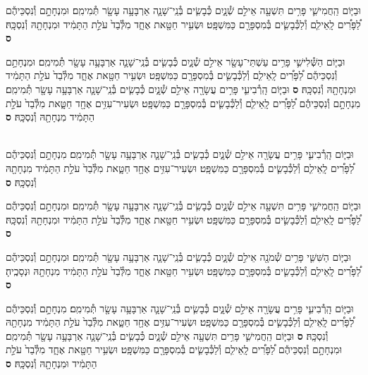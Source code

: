 \documentclass[twoside, openany, parskip=half, 11pt]{book}
\begin{document}
\begin{footnotesize}
\begin{multicols}{2}
וּבַיּ֧וֹם הַֽחֲמִישִׁ֛י פָּרִ֥ים תִּשְׁעָ֖ה אֵילִ֣ם שְׁ֯נָ֑יִם כְּ֯בָשִׂ֧ים בְּ֯נֵֽי־שָׁנָ֛ה אַרְבָּעָ֥ה עָשָׂ֖ר תְּ֯מִימִֽם׃ וּמִנְחָתָ֣ם וְ֯נִסְכֵּיהֶ֡ם לַ֠פָּרִ֠ים לָֽאֵילִ֧ם וְ֯לַכְּ֯בָשִׂ֛ים בְּ֯מִסְפָּרָ֖ם כַּמִּשְׁפָּֽט׃ וּשְׂעִ֥יר חַטָּ֖את אֶחָ֑ד מִלְּ֯בַד֙ עֹלַ֣ת הַתָּמִ֔יד וּמִנְחָתָ֖הּ וְ֯נִסְכָּֽהּ׃ \textbf{ס}

וּבַיּ֧וֹם הַשְּׁ֯לִישִׁ֛י פָּרִ֥ים עַשְׁתֵּי־עָשָׂ֖ר אֵילִ֣ם שְׁ֯נָ֑יִם כְּ֯בָשִׂ֧ים בְּ֯נֵֽי־שָׁנָ֛ה אַרְבָּעָ֥ה עָשָׂ֖ר תְּ֯מִימִֽם׃ וּמִנְחָתָ֣ם וְ֯נִסְכֵּיהֶ֡ם לַ֠פָּרִ֠ים לָֽאֵילִ֧ם וְ֯לַכְּ֯בָשִׂ֛ים בְּ֯מִסְפָּרָ֖ם כַּמִּשְׁפָּֽט׃ וּשְׂעִ֥יר חַטָּ֖את אֶחָ֑ד מִלְּ֯בַד֙ עֹלַ֣ת הַתָּמִ֔יד וּמִנְחָתָ֖הּ וְ֯נִסְכָּֽהּ׃ \textbf{ס}
וּבַיּ֧וֹם הָֽרְ֯בִיעִ֛י פָּרִ֥ים עֲשָׂרָ֖ה אֵילִ֣ם שְׁ֯נָ֑יִם כְּ֯בָשִׂ֧ים בְּ֯נֵֽי־שָׁנָ֛ה אַרְבָּעָ֥ה עָשָׂ֖ר תְּ֯מִימִֽם׃ מִנְחָתָ֣ם וְ֯נִסְכֵּיהֶ֡ם לַ֠פָּרִ֠ים לָֽאֵילִ֧ם וְ֯לַכְּ֯בָשִׂ֛ים בְּ֯מִסְפָּרָ֖ם כַּמִּשְׁפָּֽט׃ וּשְׂעִיר־עִזִּ֥ים אֶחָ֖ד חַטָּ֑את מִלְּ֯בַד֙ עֹלַ֣ת הַתָּמִ֔יד מִנְחָתָ֖הּ וְ֯נִסְכָּֽהּ׃ \textbf{ס}

\\
וּבַיּ֧וֹם הָֽרְ֯בִיעִ֛י פָּרִ֥ים עֲשָׂרָ֖ה אֵילִ֣ם שְׁ֯נָ֑יִם כְּ֯בָשִׂ֧ים בְּ֯נֵֽי־שָׁנָ֛ה אַרְבָּעָ֥ה עָשָׂ֖ר תְּ֯מִימִֽם׃ מִנְחָתָ֣ם וְ֯נִסְכֵּיהֶ֡ם לַ֠פָּרִ֠ים לָֽאֵילִ֧ם וְ֯לַכְּ֯בָשִׂ֛ים בְּ֯מִסְפָּרָ֖ם כַּמִּשְׁפָּֽט׃ וּשְׂעִיר־עִזִּ֥ים אֶחָ֖ד חַטָּ֑את מִלְּ֯בַד֙ עֹלַ֣ת הַתָּמִ֔יד מִנְחָתָ֖הּ וְ֯נִסְכָּֽהּ׃ \textbf{ס}

וּבַיּ֧וֹם הַֽחֲמִישִׁ֛י פָּרִ֥ים תִּשְׁעָ֖ה אֵילִ֣ם שְׁ֯נָ֑יִם כְּ֯בָשִׂ֧ים בְּ֯נֵֽי־שָׁנָ֛ה אַרְבָּעָ֥ה עָשָׂ֖ר תְּ֯מִימִֽם׃ וּמִנְחָתָ֣ם וְ֯נִסְכֵּיהֶ֡ם לַ֠פָּרִ֠ים לָֽאֵילִ֧ם וְ֯לַכְּ֯בָשִׂ֛ים בְּ֯מִסְפָּרָ֖ם כַּמִּשְׁפָּֽט׃ וּשְׂעִ֥יר חַטָּ֖את אֶחָ֑ד מִלְּ֯בַד֙ עֹלַ֣ת הַתָּמִ֔יד וּמִנְחָתָ֖הּ וְ֯נִסְכָּֽהּ׃ \textbf{ס}

וּבַיּ֧וֹם הַשִּׁשִּׁ֛י פָּרִ֥ים שְׁ֯מֹנָ֖ה אֵילִ֣ם שְׁ֯נָ֑יִם כְּ֯בָשִׂ֧ים בְּ֯נֵֽי־שָׁנָ֛ה אַרְבָּעָ֥ה עָשָׂ֖ר תְּ֯מִימִֽם׃ וּמִנְחָתָ֣ם וְ֯נִסְכֵּיהֶ֡ם לַ֠פָּרִ֠ים לָֽאֵילִ֧ם וְ֯לַכְּ֯בָשִׂ֛ים בְּ֯מִסְפָּרָ֖ם כַּמִּשְׁפָּֽט׃ וּשְׂעִ֥יר חַטָּ֖את אֶחָ֑ד מִלְּ֯בַד֙ עֹלַ֣ת הַתָּמִ֔יד מִנְחָתָ֖הּ וּנְסָכֶֽיהָ׃ \textbf{ס}

וּבַיּ֧וֹם הָֽרְ֯בִיעִ֛י פָּרִ֥ים עֲשָׂרָ֖ה אֵילִ֣ם שְׁ֯נָ֑יִם כְּ֯בָשִׂ֧ים בְּ֯נֵֽי־שָׁנָ֛ה אַרְבָּעָ֥ה עָשָׂ֖ר תְּ֯מִימִֽם׃ מִנְחָתָ֣ם וְ֯נִסְכֵּיהֶ֡ם לַ֠פָּרִ֠ים לָֽאֵילִ֧ם וְ֯לַכְּ֯בָשִׂ֛ים בְּ֯מִסְפָּרָ֖ם כַּמִּשְׁפָּֽט׃ וּשְׂעִיר־עִזִּ֥ים אֶחָ֖ד חַטָּ֑את מִלְּ֯בַד֙ עֹלַ֣ת הַתָּמִ֔יד מִנְחָתָ֖הּ וְ֯נִסְכָּֽהּ׃ \textbf{ס}
וּבַיּ֧וֹם הַֽחֲמִישִׁ֛י פָּרִ֥ים תִּשְׁעָ֖ה אֵילִ֣ם שְׁ֯נָ֑יִם כְּ֯בָשִׂ֧ים בְּ֯נֵֽי־שָׁנָ֛ה אַרְבָּעָ֥ה עָשָׂ֖ר תְּ֯מִימִֽם׃ וּמִנְחָתָ֣ם וְ֯נִסְכֵּיהֶ֡ם לַ֠פָּרִ֠ים לָֽאֵילִ֧ם וְ֯לַכְּ֯בָשִׂ֛ים בְּ֯מִסְפָּרָ֖ם כַּמִּשְׁפָּֽט׃ וּשְׂעִ֥יר חַטָּ֖את אֶחָ֑ד מִלְּ֯בַד֙ עֹלַ֣ת הַתָּמִ֔יד וּמִנְחָתָ֖הּ וְ֯נִסְכָּֽהּ׃ \textbf{ס}


\end{multicols}
\end{footnotesize}
\end{document}
